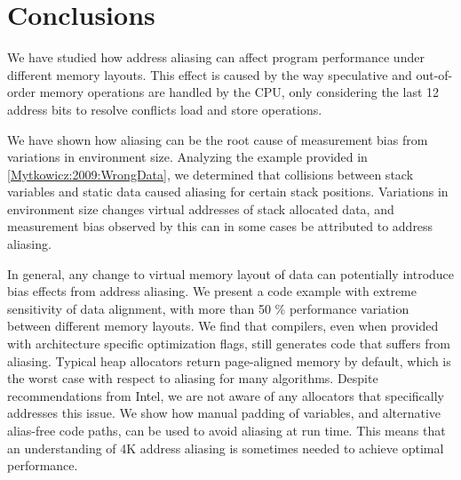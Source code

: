 \documentclass[a4paper,10pt,twocolumn,twoside]{article}
\begin{document}
\section{Conclusions}
We have studied how address aliasing can affect program performance under different memory layouts. 
This effect is caused by the way speculative and out-of-order memory operations are handled by the CPU, only considering the last 12 address bits to resolve conflicts load and store operations.

We have shown how aliasing can be the root cause of measurement bias from variations in environment size. 
Analyzing the example provided in \ref{Mytkowicz:2009:WrongData}, we determined that collisions between stack variables and static data caused aliasing for certain stack positions.
Variations in environment size changes virtual addresses of stack allocated data, and measurement bias observed by this can in some cases be attributed to address aliasing.

In general, any change to virtual memory layout of data can potentially introduce bias effects from address aliasing. 
We present a code example with extreme sensitivity of data alignment, with more than 50 \% performance variation between different memory layouts.
We find that compilers, even when provided with architecture specific optimization flags, still generates code that suffers from aliasing. 
Typical heap allocators return page-aligned memory by default, which is the worst case with respect to aliasing for many algorithms.
Despite recommendations from Intel, we are not aware of any allocators that specifically addresses this issue. 
We show how manual padding of variables, and alternative alias-free code paths, can be used to avoid aliasing at run time.
This means that an understanding of 4K address aliasing is sometimes needed to achieve optimal performance. 





\end{document}
